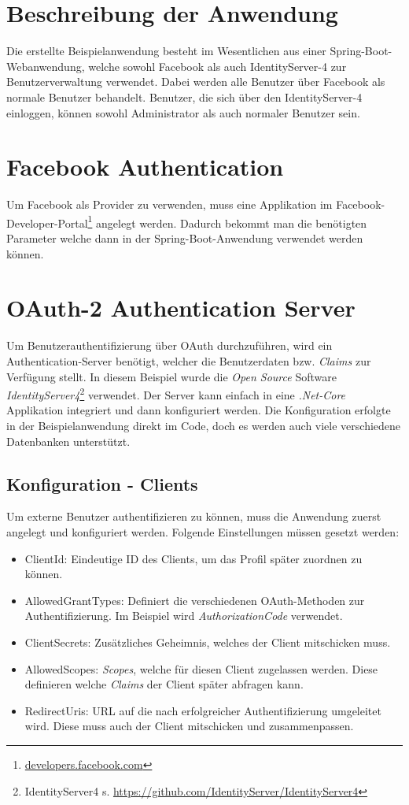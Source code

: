 \section{Beschreibung der Anwendung}
Die erstellte Beispielanwendung besteht im Wesentlichen aus einer Spring-Boot-Webanwendung, welche sowohl Facebook als auch IdentityServer-4 zur Benutzerverwaltung verwendet. Dabei werden alle Benutzer über Facebook als normale Benutzer behandelt. Benutzer, die sich über den IdentityServer-4 einloggen, können sowohl Administrator als auch normaler Benutzer sein. 

\section{Facebook Authentication}
Um Facebook als Provider zu verwenden, muss eine Applikation im Facebook-Developer-Portal\footnote{\url{developers.facebook.com}} angelegt werden. Dadurch bekommt man die benötigten Parameter welche dann in der Spring-Boot-Anwendung verwendet werden können.

\section{OAuth-2 Authentication Server}
Um Benutzerauthentifizierung über OAuth durchzuführen, wird ein Authentication-Server benötigt, welcher die Benutzerdaten bzw. \emph{Claims} zur Verfügung stellt. In diesem Beispiel wurde die \emph{Open Source} Software \emph{IdentityServer4}\footnote{IdentityServer4 s. \url{https://github.com/IdentityServer/IdentityServer4}} verwendet. 
\newline
\newline
Der Server kann einfach in eine \emph{.Net-Core} Applikation integriert und dann konfiguriert werden. Die Konfiguration erfolgte in der Beispielanwendung direkt im Code, doch es werden auch viele verschiedene Datenbanken unterstützt.
\subsection*{Konfiguration - Clients}
Um externe Benutzer authentifizieren zu können, muss die Anwendung zuerst angelegt und konfiguriert werden.
Folgende Einstellungen müssen gesetzt werden:
\begin{itemize}
\item ClientId: Eindeutige ID des Clients, um das Profil später zuordnen zu können.
\item AllowedGrantTypes: Definiert die verschiedenen OAuth-Methoden zur Authentifizierung. Im Beispiel wird \emph{AuthorizationCode} verwendet.
\item ClientSecrets: Zusätzliches Geheimnis, welches der Client mitschicken muss.
\item AllowedScopes: \emph{Scopes}, welche für diesen Client zugelassen werden. Diese definieren welche \emph{Claims} der Client später abfragen kann.
\item RedirectUris: URL auf die nach erfolgreicher Authentifizierung umgeleitet wird. Diese muss auch der Client mitschicken und zusammenpassen.
\end{itemize}

